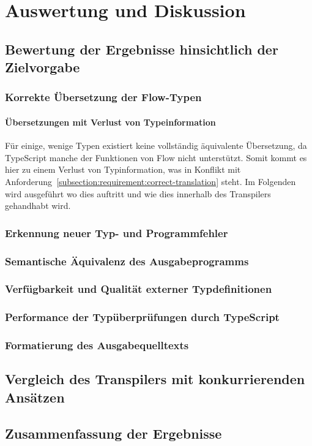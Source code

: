 \chapter{Auswertung und Diskussion}
\label{chap:evaluation}


\section{Bewertung der Ergebnisse hinsichtlich der Zielvorgabe}

\subsection{Korrekte Übersetzung der Flow-Typen}

\subsubsection{Übersetzungen mit Verlust von Typeinformation}

Für einige, wenige Typen existiert keine vollständig äquivalente Übersetzung, da TypeScript manche der Funktionen von Flow nicht unterstützt. Somit kommt es hier zu einem Verlust von Typinformation, was in Konflikt mit Anforderung~\ref{subsection:requirement:correct-translation} steht. Im Folgenden wird ausgeführt wo dies auftritt und wie dies innerhalb des Transpilers gehandhabt wird.

\subsection{Erkennung neuer Typ- und Programmfehler}

\subsection{Semantische Äquivalenz des Ausgabeprogramms}

\subsection{Verfügbarkeit und Qualität externer Typdefinitionen}

\subsection{Performance der Typüberprüfungen durch TypeScript}

\subsection{Formatierung des Ausgabequelltexts}

\section{Vergleich des Transpilers mit konkurrierenden Ansätzen}

\section{Zusammenfassung der Ergebnisse}
